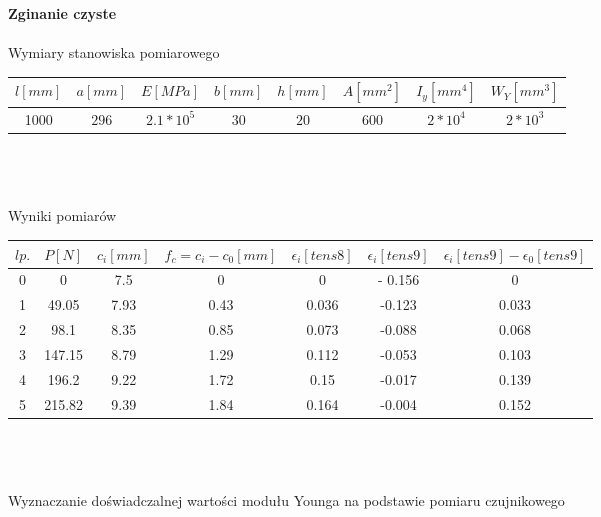 \documentclass[11pt]{article}
\begin{document}
\textbf{Zginanie czyste}\\\\
Wymiary stanowiska pomiarowego\\
\begin{tabular}{|c|c|c|c|c|c|c|c|}
\hline
$l[mm]$ & $a[mm]$ & $E[MPa]$ & $b[mm]$ & $h[mm]$ & $A[mm^2]$ & $I_y[mm^4]$ & $W_Y[mm^3]$\\ \hline
1000 & $296$ & $2.1*10^5$ & $30$ & $20$ & $600$ & $2*10^4$ & $2*10^3$\\ \hline
\end{tabular}
\\\\\\
Wyniki pomiarów\\
\begin{tabular}{|c|c|c|c|c|c|c|}\hline
$lp.$ & $P[N]$ & $c_i[mm]$ & $f_c = c_i - c_0[mm]$ & $\epsilon_i[tens 8]$ & $\epsilon_i[tens 9]$ & $\epsilon_i[tens9] - \epsilon_0[tens9]$\\ \hline
0 & 0 & 7.5 & 0 & 0 & - 0.156 & 0\\ \hline
1 & 49.05 & 7.93 & 0.43 & 0.036 & -0.123 & 0.033\\ \hline
2 & 98.1 & 8.35 & 0.85 & 0.073 & -0.088 & 0.068\\ \hline
3 & 147.15 & 8.79 & 1.29 & 0.112 & -0.053 & 0.103\\ \hline
4 & 196.2 & 9.22 & 1.72 & 0.15 & -0.017 & 0.139\\ \hline
5 & 215.82 & 9.39 & 1.84 & 0.164 & -0.004 & 0.152\\ \hline
\end{tabular}
\\\\\\
Wyznaczanie doświadczalnej wartości modułu Younga na podstawie pomiaru czujnikowego\\
\end{document}
